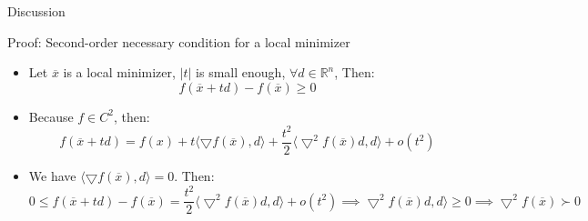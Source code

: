     \begin{frame}{Discussion}
        \begin{block}{Proof: Second-order necessary condition for a local minimizer}
        \begin{itemize}
            \item Let $\overline{x}$ is a local minimizer, $|t|$ is small enough, $\forall d \in \mathbb{R}^n$, Then:
                \begin{equation}
                    f(\overline{x} + td) - f(\overline{x}) \geq 0
                \end{equation}
            \item Because $f \in C^2$, then:
                \begin{equation}
                    f(\overline{x} +td) = f(x) + t\langle \bigtriangledown f(\overline{x}), d \rangle + \frac{t^2}{2}\langle \bigtriangledown^2 f(\overline{x})d, d \rangle + o(t^2)
                \end{equation}
            \item  We have $\langle \bigtriangledown f(\overline{x}), d \rangle = 0$. Then:
                \begin{equation}
                    0 \leq f(\overline{x} + td) - f(\overline{x}) = \frac{t^2}{2}\langle \bigtriangledown^2 f(\overline{x})d, d \rangle + o(t^2) \implies \bigtriangledown^2 f(\overline{x})d, d \rangle \geq 0 \implies \bigtriangledown^2 f(\overline{x}) \succ 0
                \end{equation}
        \end{itemize}
        \end{block}
    \end{frame}

